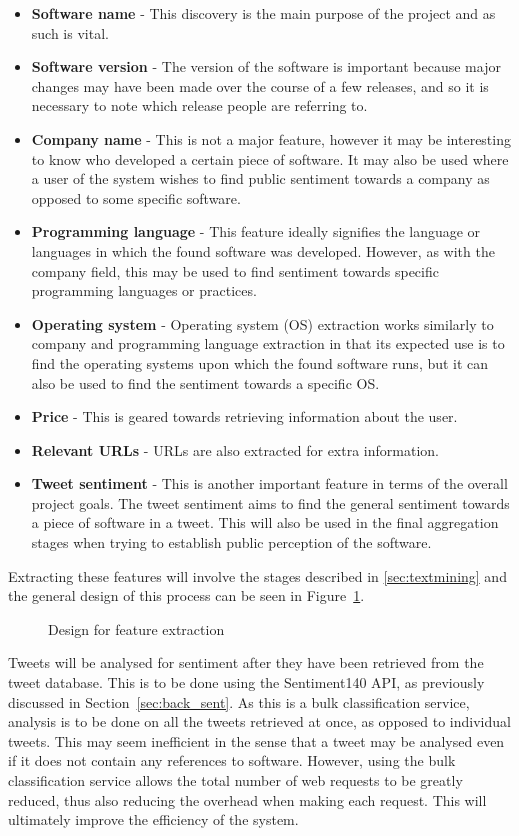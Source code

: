 \begin{itemize}
\item \textbf{Software name} - This discovery is the main purpose of the project and as such is vital.
\item \textbf{Software version} - The version of the software is important because major changes may have been made over the course of a few releases, and so it is necessary to note which release people are referring to.
\item \textbf{Company name} -  This is not a major feature, however it may be interesting to know who developed a certain piece of software. It may also be used where a user of the system wishes to find public sentiment towards a company as opposed to some specific software.
\item \textbf{Programming language} - This feature ideally signifies the language or languages in which the found software was developed. However, as with the company field, this may be used to find sentiment towards specific programming languages or practices.
\item \textbf{Operating system} - Operating system (OS) extraction works similarly to company and programming language extraction in that its expected use is to find the operating systems upon which the found software runs, but it can also be used to find the sentiment towards a specific OS.
\item \textbf{Price} - This is geared towards retrieving information about the user.
\item \textbf{Relevant URLs} - URLs are also extracted for extra information.
\item \textbf{Tweet sentiment} - This is another important feature in terms of the overall project goals. The tweet sentiment aims to find the general sentiment towards a piece of software in a tweet. This will also be used in the final aggregation stages when trying to establish public perception of the software.
\end{itemize}

Extracting these features will involve the stages described in \ref{sec:textmining} and the general design of this process can be seen in Figure~\ref{fig:phase2}. 

\begin{figure}[h]
  \centering
  
  \caption{Design for feature extraction
    \label{fig:phase2}}
\end{figure}

Tweets will be analysed for sentiment after they have been retrieved from the tweet database. This is to be done using the Sentiment140 API, as previously discussed in Section~\ref{sec:back_sent}. As this is a bulk classification service, analysis is to be done on all the tweets retrieved at once, as opposed to individual tweets. This may seem inefficient in the sense that a tweet may be analysed even if it does not contain any references to software. However, using the bulk classification service allows the total number of web requests to be greatly reduced, thus also reducing the overhead when making each request. This will ultimately improve the efficiency of the system.

